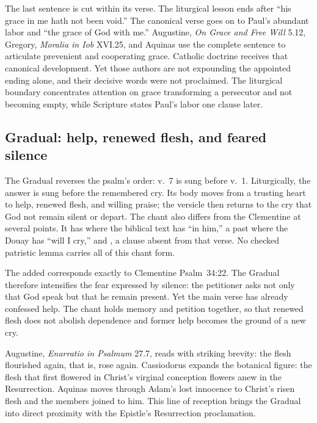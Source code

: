 The last sentence is cut within its verse. The liturgical lesson
ends after ``his grace in me hath not been void.'' The canonical verse goes on
to Paul's abundant labor and ``the grace of God with me.'' Augustine,
\emph{On Grace and Free Will} 5.12, Gregory, \emph{Moralia in Iob} XVI.25,
and Aquinas use the complete sentence to articulate prevenient and cooperating
grace. Catholic doctrine receives that canonical development. Yet those
authors are not expounding the appointed ending alone, and their decisive
words were not proclaimed. The liturgical boundary concentrates attention on
grace transforming a persecutor and not becoming empty, while Scripture
states Paul's labor one clause later.

\subsection*{Gradual: help, renewed flesh, and feared silence\enspace{}}

The Gradual reverses the psalm's order: v.~7 is sung before v.~1. Liturgically,
the answer is sung before the remembered cry. Its body
moves from a trusting heart to help, renewed flesh, and willing praise; the
versicle then returns to the cry that God not remain silent or depart. The
chant also differs from the Clementine at several points. It has
 where the biblical text has ``in him,'' a past
 where the Douay has ``will I cry,'' and
, a clause absent from that verse. No checked
patristic lemma carries all of this chant form.

The added  corresponds exactly to Clementine
Psalm~34:22. The Gradual therefore intensifies the fear expressed by silence:
the petitioner asks not only that God speak but that he remain present. Yet the
main verse has already confessed help. The chant holds memory and petition
together, so that renewed flesh does not abolish dependence and former help
becomes the ground of a new cry.

Augustine, \emph{Enarratio in Psalmum} 27.7, reads
 with striking brevity: the flesh flourished again,
that is, rose again. Cassiodorus expands the botanical figure: the flesh that
first flowered in Christ's virginal conception flowers anew in the
Resurrection. Aquinas moves through Adam's lost innocence to Christ's risen
flesh and the members joined to him. This line of reception brings the
Gradual into direct proximity with the Epistle's Resurrection proclamation.

